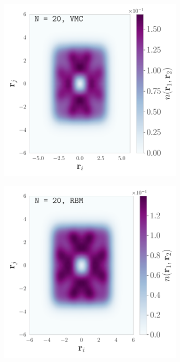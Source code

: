 \begin{figure}[H]
\begin{subfigure}[t]{0.32\textwidth}
        \hspace{-1cm}
    \end{subfigure}
    \begin{subfigure}[t]{0.32\textwidth}
        \centering
        \includegraphics[width=\textwidth]{Chapters/Results/dots/two_body_density_N[20]_nqs_VMC_0.5.pdf}
        \hspace{-1cm}
    \end{subfigure}
    \begin{subfigure}[t]{0.32\textwidth}
        \centering
        \includegraphics[width=\textwidth]{Chapters/Results/dots/two_body_density_N[20]_nqs_RBM_0.5.pdf}

\end{subfigure}
\end{figure}
